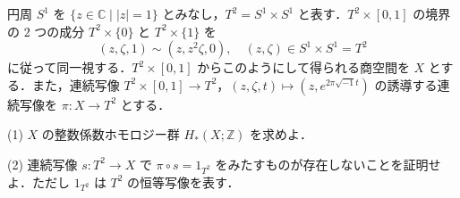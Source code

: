 \documentclass[12pt]{jlreq}
\newcommand{\C}{\mathbb{C}}
\begin{document}
円周 \(S^1\) を \(\{ z \in \C \mid |z| = 1 \}\) とみなし，\(T^2 = S^1 \times S^1\) と表す．\(T^2 \times [0, 1]\) の境界の \(2\) つの成分 \(T^2 \times \{0\}\) と \(T^2 \times \{1\}\) を
\[
  (z, \zeta, 1) \sim (z, z^2 \zeta, 0), \quad (z, \zeta) \in S^1 \times S^1 = T^2
\]
に従って同一視する．\(T^2 \times [0, 1]\) からこのようにして得られる商空間を \(X\) とする．また，連続写像 \(T^2 \times [0, 1] \to T^2\)，\((z, \zeta, t) \mapsto (z, e^{2\pi\sqrt{-1}t})\) の誘導する連続写像を \(\pi : X \to T^2\) とする．

(1) \(X\) の整数係数ホモロジー群 \(H_*(X; \mathbb{Z})\) を求めよ．

(2) 連続写像 \(s : T^2 \to X\) で \(\pi \circ s = 1_{T^2}\) をみたすものが存在しないことを証明せよ．ただし \(1_{T^2}\) は \(T^2\) の恒等写像を表す．
\end{document}
